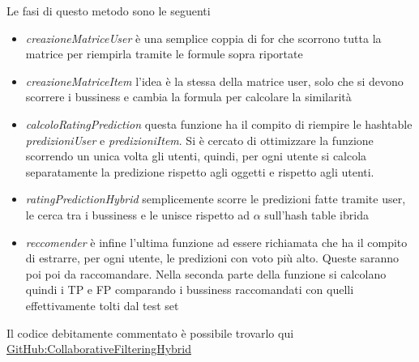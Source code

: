 \documentclass[12pt]{article}
\begin{document}
Le fasi di questo metodo sono le seguenti
\begin{itemize}
\item \textit{creazioneMatriceUser} è una semplice coppia di for che scorrono tutta la matrice per riempirla tramite le formule sopra riportate
\item \textit{creazioneMatriceItem} l'idea è la stessa della matrice user, solo che si devono scorrere i bussiness e cambia la formula per calcolare la similarità
\item \textit{calcoloRatingPrediction} questa funzione ha il compito di riempire le hashtable \textit{predizioniUser} e \textit{predizioniItem}. Si è cercato di ottimizzare la funzione scorrendo un unica volta gli utenti, quindi, per ogni utente si calcola separatamente la predizione rispetto agli oggetti e rispetto agli utenti.
\item \textit{ratingPredictionHybrid} semplicemente scorre le predizioni fatte tramite user, le cerca tra i bussiness e le unisce rispetto ad $\alpha$ sull'hash table ibrida
\item \textit{reccomender} è infine l'ultima funzione ad essere richiamata che ha il compito di estrarre, per ogni utente, le predizioni con voto più alto. Queste saranno poi poi da raccomandare. Nella seconda parte della funzione si calcolano quindi i TP e FP comparando i bussiness raccomandati con quelli effettivamente tolti dal test set
\end{itemize}

Il codice debitamente commentato è possibile trovarlo qui\\
\href{https://github.com/sfcoding-school/CollaborativeFilteringHybrid}{GitHub:CollaborativeFilteringHybrid}
\end{document}
